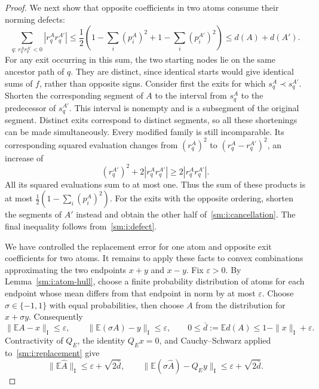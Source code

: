 \begin{proof}
We next show that opposite coefficients in two atoms consume their
norming defects:
\begin{equation}
 \sum_{q:\,r_q^Ar_q^{A'}<0}|r_q^Ar_q^{A'}|
 \leq \frac12\left(1-\sum_i(p_i^A)^2
                  +1-\sum_i(p_i^{A'})^2\right)
 \leq d(A)+d(A').
 \label{sm:i:cancellation}
\end{equation}
For any exit occurring in this sum, the two starting nodes lie on the
same ancestor path of $q$.  They are distinct, since identical starts
would give identical sums of $f$, rather than opposite signs.
Consider first the exits for which $s_q^A\prec s_q^{A'}$.
Shorten the corresponding segment of $A$ to the interval from $s_q^A$
to the predecessor of $s_q^{A'}$.  This interval is nonempty and is a
subsegment of the original segment.  Distinct exits correspond to
distinct segments, so all these shortenings can be made simultaneously.
Every modified family is still incomparable.  Its corresponding
squared evaluation changes from $(r_q^A)^2$ to
$(r_q^A-r_q^{A'})^2$, an increase of
\[
 (r_q^{A'})^2+2|r_q^Ar_q^{A'}|
 \geq2|r_q^Ar_q^{A'}|.
\]
All its squared evaluations sum to at most one.  Thus the sum of these
products is at most $\tfrac12(1-\sum_i(p_i^A)^2)$.
For the exits with the opposite ordering, shorten the segments of $A'$
instead and obtain the other half of~\eqref{sm:i:cancellation}.
The final inequality follows from~\eqref{sm:i:defect}.

We have controlled the replacement error for one atom and opposite
exit coefficients for two atoms.  It remains to apply these facts to
convex combinations approximating the two endpoints $x+y$ and $x-y$.
Fix $\varepsilon>0$.  By Lemma~\ref{sm:i:atom-hull}, choose a finite
probability distribution of atoms for each endpoint whose mean differs
from that endpoint in norm by at most $\varepsilon$.  Choose
$\sigma\in\{-1,1\}$ with equal probabilities, then choose $A$ from the
distribution for $x+\sigma y$.  Consequently
\[
 \|\mathbb E A-x\|_{\mathrm I}\leq\varepsilon,
 \qquad
 \|\mathbb E(\sigma A)-y\|_{\mathrm I}\leq\varepsilon,
 \qquad
 0\leq\bar d:=\mathbb E d(A)
 \leq1-\|x\|_{\mathrm I}+\varepsilon.
\]
Contractivity of $Q_E$, the identity $Q_Ex=0$, and
Cauchy--Schwarz applied to~\eqref{sm:i:replacement} give
\begin{equation}
 \|\mathbb E\widehat A\|_{\mathrm I}
 \leq\varepsilon+\sqrt{2\bar d},
 \qquad
 \|\mathbb E(\sigma\widehat A)-Q_Ey\|_{\mathrm I}
 \leq\varepsilon+\sqrt{2\bar d}.
 \label{sm:i:mixture-errors}
\end{equation}


\end{proof}
